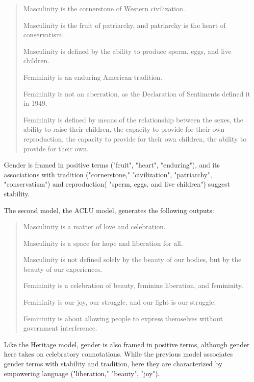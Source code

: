 \documentclass{article}
\begin{document}
\begin{quote}

Masculinity is the cornerstone of Western civilization.

Masculinity is the fruit of patriarchy, and patriarchy is the heart
of conservatism.

Masculinity is defined by the ability to produce sperm, eggs, and live
children.

Femininity is an enduring American tradition.

Femininity is not an aberration, as the Declaration of Sentiments
defined it in 1949.

Femininity is defined by means of the relationship between the sexes,
the ability to raise their children, the capacity to provide for their
own reproduction, the capacity to provide for their own children, the
ability to provide for their own.

\end{quote}

Gender is framed in positive terms ("fruit", "heart", "enduring"), and its associations with tradition ("cornerstone," "civilization", "patriarchy", "conservatism") and reproduction( "sperm, eggs, and live children") suggest stability. 

The second model, the ACLU model, generates the following outputs:

\begin{quote}

Masculinity is a matter of love and celebration.

Masculinity is a space for hope and liberation for all.

Masculinity is not defined solely by the beauty of our bodies, but by
the beauty of our experiences.

Femininity is a celebration of beauty, feminine liberation, and
femininity.

Femininity is our joy, our struggle, and our fight is our struggle.

Femininity is about allowing people to express themselves without
government interference.

\end{quote}

Like the Heritage model, gender is also framed in positive terms, although gender here takes on celebratory connotations. While the previous model associates gender terms with stability and tradition, here they are characterized by empowering language ("liberation," "beauty", "joy").
\end{document}
